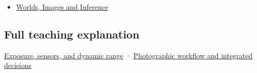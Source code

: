\begin{itemize}
\tightlist
\item
  \href{Continuous\%20Notes/University\%20-\%20Worlds,\%20Images\%20and\%20Inference\%20-\%20Graphics,\%20Vision\%20and\%20Photography}{Worlds, Images and Inference}
\end{itemize}

\subsection{Full teaching explanation}\label{full-teaching-explanation}

\href{Continuous\%20Notes/University\%20-\%20Worlds,\%20Images\%20and\%20Inference\%20-\%20Graphics,\%20Vision\%20and\%20Photography\#Exposure,\%20sensors,\%20and\%20dynamic\%20range}{Exposure, sensors, and dynamic range} · \href{Continuous\%20Notes/University\%20-\%20Worlds,\%20Images\%20and\%20Inference\%20-\%20Graphics,\%20Vision\%20and\%20Photography\#Photographic\%20workflow\%20and\%20integrated\%20decisions}{Photographic workflow and integrated decisions}
